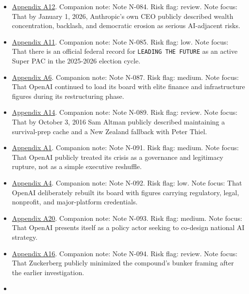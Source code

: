 \documentclass[
  american,
  11pt,
  letterpaper,
]{article}
\begin{document}
\begin{itemize}
\item
  \hyperref[appendix-a12-the-adolescence-of-technology]{Appendix A12}.
  Companion note: Note N-084. Risk flag: review. Note focus: That by
  January 1, 2026, Anthropic's own CEO publicly described wealth
  concentration, backlash, and democratic erosion as serious AI-adjacent
  risks.
\item
  \hyperref[appendix-a11-leading-the-future-committee-overview]{Appendix
  A11}. Companion note: Note N-085. Risk flag: low. Note focus: That
  there is an official federal record for \texttt{LEADING\ THE\ FUTURE}
  as an active Super PAC in the 2025-2026 election cycle.
\item
  \hyperref[appendix-a6-openai-appoints-one-of-wall-street-s-most-powerful-dealmakers-to-its-board]{Appendix
  A6}. Companion note: Note N-087. Risk flag: medium. Note focus: That
  OpenAI continued to load its board with elite finance and
  infrastructure figures during its restructuring phase.
\item
  \hyperref[appendix-a14-sam-altman-s-manifest-destiny]{Appendix A14}.
  Companion note: Note N-089. Risk flag: review. Note focus: That by
  October 3, 2016 Sam Altman publicly described maintaining a
  survival-prep cache and a New Zealand fallback with Peter Thiel.
\item
  \hyperref[appendix-a1-openai-announces-leadership-transition]{Appendix
  A1}. Companion note: Note N-091. Risk flag: medium. Note focus: That
  OpenAI publicly treated its crisis as a governance and legitimacy
  rupture, not as a simple executive reshuffle.
\item
  \hyperref[appendix-a4-openai-announces-new-members-to-board-of-directors]{Appendix
  A4}. Companion note: Note N-092. Risk flag: low. Note focus: That
  OpenAI deliberately rebuilt its board with figures carrying
  regulatory, legal, nonprofit, and major-platform credentials.
\item
  \hyperref[appendix-a20-openais-proposals-for-the-us-ai-action-plan]{Appendix
  A20}. Companion note: Note N-093. Risk flag: medium. Note focus: That
  OpenAI presents itself as a policy actor seeking to co-design national
  AI strategy.
\item
  \hyperref[appendix-a16-mark-zuckerberg-downplays-his-5-000-square-foot-underground-bunker-in-hawaii-just-a-little-shelter]{Appendix
  A16}. Companion note: Note N-094. Risk flag: review. Note focus: That
  Zuckerberg publicly minimized the compound's bunker framing after the
  earlier investigation.
\item

\end{itemize}
\end{document}
